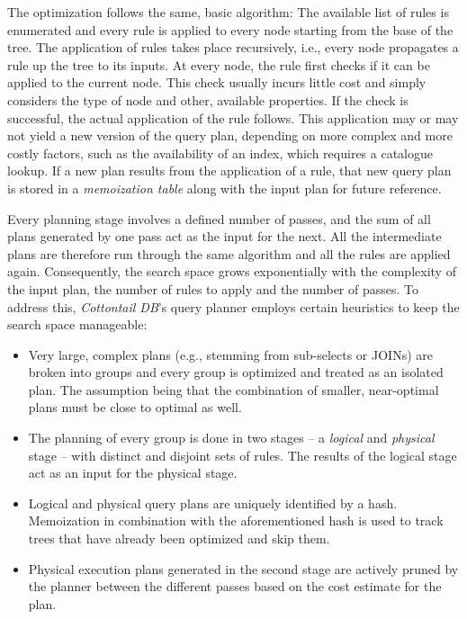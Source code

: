 The optimization follows the same, basic algorithm: The available list of rules is enumerated and every rule is applied to every node starting from the base of the tree. The application of rules takes place recursively, i.e., every node propagates a rule up the tree to its inputs. At every node, the rule first checks if it can be applied to the current node. This check usually incurs little cost and simply considers the type of node and other, available properties. If the check is successful, the actual application of the rule follows. This application may or may not yield a new version of the query plan, depending on more complex and more costly factors, such as the availability of an index, which requires a catalogue lookup. If a new plan results from the application of a rule, that new query plan is stored in a \emph{memoization table} along with the input plan for future reference. 

Every planning stage involves a defined number of passes, and the sum of all plans generated by one pass act as the input for the next. All the intermediate plans are therefore run through the same algorithm and all the rules are applied again. Consequently, the search space grows exponentially with the complexity of the input plan, the number of rules to apply and the number of passes. To address this, \emph{Cottontail DB}'s query planner employs certain heuristics to keep the search space manageable:

\begin{itemize}
    \item Very large, complex plans (e.g., stemming from sub-selects or JOINs) are broken into groups and every group is optimized and treated as an isolated plan. The assumption being that the combination of smaller, near-optimal plans must be close to optimal as well.
    \item The planning of every group is done in two stages -- a \emph{logical} and \emph{physical} stage -- with distinct and disjoint sets of rules. The results of the logical stage act as an input for the physical stage.
    \item Logical and physical query plans are uniquely identified by a hash. Memoization in combination with the aforementioned hash is used to track trees that have already been optimized and skip them.
    \item Physical execution plans generated in the second stage are actively pruned by the planner between the different passes based on the cost estimate for the plan.
\end{itemize}

